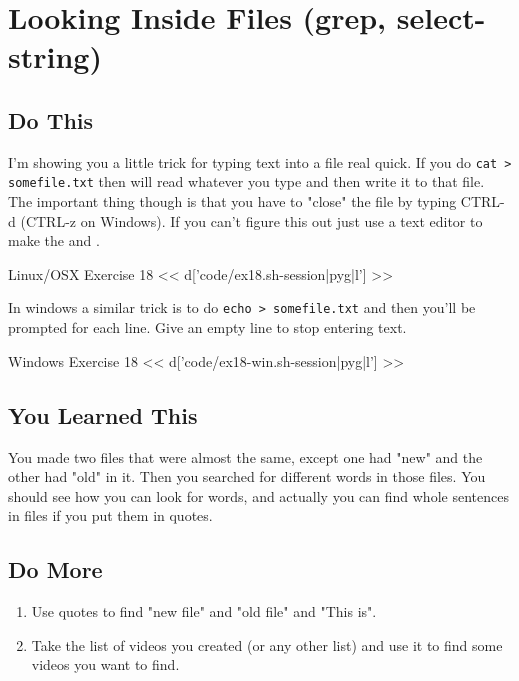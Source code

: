 \chapter{Looking Inside Files (grep, select-string)}

\section{Do This}

I'm showing you a little trick for typing text into a file real quick.  If you
do \verb|cat > somefile.txt| then  will read whatever you type and
then write it to that file.  The important thing though is that you have to
"close" the file by typing CTRL-d (CTRL-z on Windows).  If you can't figure this 
out just use a text editor to make the  and .

\begin{code}{Linux/OSX Exercise 18}
<< d['code/ex18.sh-session|pyg|l'] >>
\end{code}

In windows a similar trick is to do \verb|echo > somefile.txt| and then you'll
be prompted for each line.  Give an empty line to stop entering text.

\begin{code}{Windows Exercise 18}
<< d['code/ex18-win.sh-session|pyg|l'] >>
\end{code}

\section{You Learned This}

You made two files that were almost the same, except one had "new" and the other 
had "old" in it.  Then you searched for different words in those files.  You should
see how you can look for words, and actually you can find whole sentences in
files if you put them in quotes.

\section{Do More}

\begin{enumerate}
\item Use quotes to find "new file" and "old file" and "This is".
\item Take the list of videos you created (or any other list) and use it to find some videos you want to find.
\end{enumerate}

